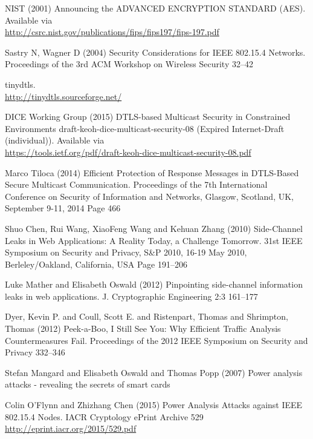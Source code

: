 \begin{thebibliography}{99.}
 NIST (2001) Announcing the ADVANCED ENCRYPTION STANDARD (AES). Available via\\
\url{http://csrc.nist.gov/publications/fips/fips197/fips-197.pdf}

 Sastry N, Wagner D (2004) Security Considerations for IEEE 802.15.4 Networks. Proceedings of the 3rd ACM Workshop on Wireless Security 32--42

 tinydtls. \\ 
\url{http://tinydtls.sourceforge.net/}

 DICE Working Group (2015) DTLS-based Multicast Security in Constrained Environments
 draft-keoh-dice-multicast-security-08 (Expired Internet-Draft (individual)). Available via\\
\url{https://tools.ietf.org/pdf/draft-keoh-dice-multicast-security-08.pdf}

 Marco Tiloca (2014) Efficient Protection of Response Messages in DTLS-Based Secure Multicast Communication. Proceedings of the 7th International Conference on Security of Information and Networks, Glasgow, Scotland, UK, September 9-11, 2014 Page 466

 Shuo Chen, Rui Wang, XiaoFeng Wang and Kehuan Zhang (2010) Side-Channel Leaks in Web Applications: {A} Reality Today, a Challenge Tomorrow. 31st {IEEE} Symposium on Security and Privacy, S{\&}P 2010, 16-19 May 2010, Berleley/Oakland, California, {USA} Page 191--206

 Luke Mather and Elisabeth Oswald (2012) Pinpointing side-channel information leaks in web applications. J. Cryptographic Engineering 2:3 161--177

 Dyer, Kevin P. and Coull, Scott E. and Ristenpart, Thomas and Shrimpton, Thomas (2012) Peek-a-Boo, I Still See You: Why Efficient Traffic Analysis Countermeasures Fail. Proceedings of the 2012 IEEE Symposium on Security and Privacy 332--346

 Stefan Mangard and Elisabeth Oswald and Thomas Popp (2007) Power analysis attacks - revealing the secrets of smart cards

 Colin O'Flynn and Zhizhang Chen (2015) Power Analysis Attacks against IEEE 802.15.4 Nodes. IACR Cryptology ePrint Archive 529\\
\url{http://eprint.iacr.org/2015/529.pdf}
\end{thebibliography}